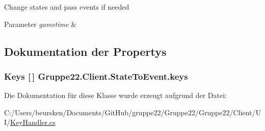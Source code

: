 Change states and pass events if needed 


\begin{DoxyParams}{Parameter}
{\em gametime} & \\
\hline
\end{DoxyParams}


\subsection{Dokumentation der Propertys}
\hypertarget{class_gruppe22_1_1_client_1_1_state_to_event_a65989c04116808478b150febeeb9f8b6}{
\subsubsection[{keys}]{\setlength{\rightskip}{0pt plus 5cm}Keys \mbox{[}$\,$\mbox{]} Gruppe22.\-Client.\-State\-To\-Event.\-keys\hspace{0.3cm}{\ttfamily [get]}}}\label{class_gruppe22_1_1_client_1_1_state_to_event_a65989c04116808478b150febeeb9f8b6}


Die Dokumentation für diese Klasse wurde erzeugt aufgrund der Datei\-:\begin{DoxyCompactItemize}
\item 
C\-:/\-Users/beursken/\-Documents/\-Git\-Hub/gruppe22/\-Gruppe22/\-Gruppe22/\-Client/\-U\-I/\hyperlink{_key_handler_8cs}{Key\-Handler.\-cs}\end{DoxyCompactItemize}
